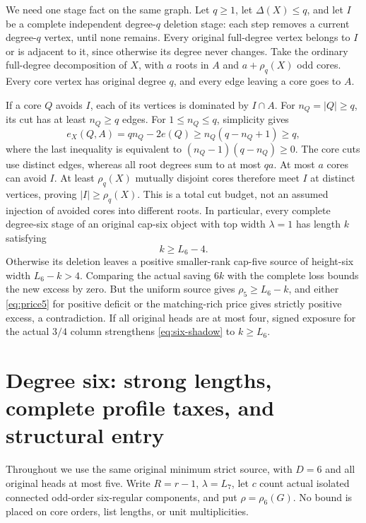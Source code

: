 \documentclass[11pt,a4paper]{article}
\theoremstyle{definition}
\begin{document}
We need one stage fact on the same graph. Let $q\ge1$, let $\Delta(X)\le q$, and let $I$ be a complete independent degree-$q$ deletion stage: each step removes a current degree-$q$ vertex, until none remains. Every original full-degree vertex belongs to $I$ or is adjacent to it, since otherwise its degree never changes. Take the ordinary full-degree decomposition of $X$, with $a$ roots in $A$ and $a+\rho_q(X)$ odd cores. Every core vertex has original degree $q$, and every edge leaving a core goes to $A$.

If a core $Q$ avoids $I$, each of its vertices is dominated by $I\cap A$. For $n_Q=|Q|\ge q$, its cut has at least $n_Q\ge q$ edges. For $1\le n_Q\le q$, simplicity gives
\[
e_X(Q,A)=qn_Q-2e(Q)\ge n_Q(q-n_Q+1)\ge q,
\]
where the last inequality is equivalent to $(n_Q-1)(q-n_Q)\ge0$. The core cuts use distinct edges, whereas all root degrees sum to at most $qa$. At most $a$ cores can avoid $I$. At least $\rho_q(X)$ mutually disjoint cores therefore meet $I$ at distinct vertices, proving $|I|\ge\rho_q(X)$. This is a total cut budget, not an assumed injection of avoided cores into different roots.
In particular, every complete degree-six stage of an original cap-six object with top width $\lambda=1$ has length $k$ satisfying
\begin{equation}\label{eq:six-shadow}
 k\ge L_6-4.
\end{equation}
Otherwise its deletion leaves a positive smaller-rank cap-five source of height-six width $L_6-k>4$. Comparing the actual saving $6k$ with the complete loss bounds the new excess by zero. But the uniform source gives $\rho_5\ge L_6-k$, and either \eqref{eq:price5} for positive deficit or the matching-rich price gives strictly positive excess, a contradiction. If all original heads are at most four, signed exposure for the actual $3/4$ column strengthens \eqref{eq:six-shadow} to $k\ge L_6$.

\section{Degree six: strong lengths, complete profile taxes, and structural entry}\label{app:D6-structure}
Throughout we use the same original minimum strict source, with $D=6$ and all original heads at most five. Write $R=r-1$, $\lambda=L_7$, let $c$ count actual isolated connected odd-order six-regular components, and put $\rho=\rho_6(G)$. No bound is placed on core orders, list lengths, or unit multiplicities.
\end{document}
